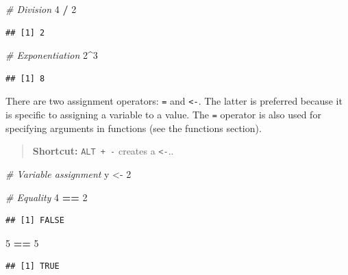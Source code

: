 \documentclass[
  openany]{book}
\newenvironment{Shaded}{\begin{snugshade}}{\end{snugshade}}
\newcommand{\CommentTok}[1]{\textcolor[rgb]{0.56,0.35,0.01}{\textit{#1}}}
\newcommand{\DecValTok}[1]{\textcolor[rgb]{0.00,0.00,0.81}{#1}}
\newcommand{\NormalTok}[1]{#1}
\newcommand{\OperatorTok}[1]{\textcolor[rgb]{0.81,0.36,0.00}{\textbf{#1}}}
\newcommand{\StringTok}[1]{\textcolor[rgb]{0.31,0.60,0.02}{#1}}
\begin{document}
\begin{Shaded}
\begin{Highlighting}[]
\CommentTok{# Division}
\DecValTok{4} \OperatorTok{/}\StringTok{ }\DecValTok{2}
\end{Highlighting}
\end{Shaded}

\begin{verbatim}
## [1] 2
\end{verbatim}

\begin{Shaded}
\begin{Highlighting}[]
\CommentTok{# Exponentiation}
\DecValTok{2}\OperatorTok{^}\DecValTok{3}
\end{Highlighting}
\end{Shaded}

\begin{verbatim}
## [1] 8
\end{verbatim}

There are two assignment operators: \texttt{=} and \texttt{\textless{}-}. The latter is preferred because
it is specific to assigning a variable to a value. The \texttt{=} operator is also used
for specifying arguments in functions (see the functions section).

\begin{quote}
\textbf{Shortcut:} \texttt{ALT\ +\ -} creates a \texttt{\textless{}-}..
\end{quote}

\begin{Shaded}
\begin{Highlighting}[]
\CommentTok{# Variable assignment}
\NormalTok{y <-}\StringTok{ }\DecValTok{2}

\CommentTok{# Equality}
\DecValTok{4} \OperatorTok{==}\StringTok{ }\DecValTok{2}
\end{Highlighting}
\end{Shaded}

\begin{verbatim}
## [1] FALSE
\end{verbatim}

\begin{Shaded}
\begin{Highlighting}[]
\DecValTok{5} \OperatorTok{==}\StringTok{ }\DecValTok{5}
\end{Highlighting}
\end{Shaded}

\begin{verbatim}
## [1] TRUE
\end{verbatim}
\end{document}
